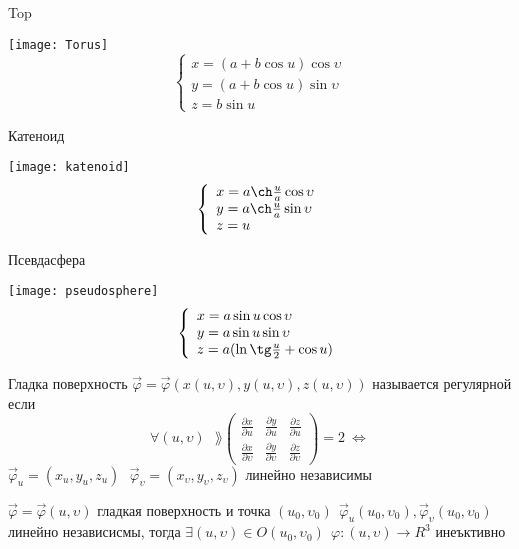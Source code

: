\begin{block}[Примеры]
  \begin{center}
    Top
  \end{center}
  \texttt{[image: Torus]}
  $$
  \left\{
  \begin{array}{l}
    x = (a + b\cos u) \cos \upsilon \\
    y = (a + b\cos u) \sin \upsilon \\
    z = b \sin u
  \end{array}
  \right.
  $$
  \begin{center}
    Катеноид
  \end{center}
  \texttt{[image: katenoid]}
  $$
  \left\{
  \begin{array}{l}
    x = a \ch \frac{u}{a} \cos \upsilon \\
    y = a \ch \frac{u}{a} \sin \upsilon \\
    z = u
  \end{array}
  \right.
  $$
  \begin{center}
    Псевдасфера
  \end{center}
  \texttt{[image: pseudosphere]}
  $$
  \left\{
  \begin{array}{l}
    x = a \sin u \cos \upsilon \\
    y = a \sin u \sin \upsilon \\
    z = a( \ln \tg \frac{u}{2} + \cos u)
  \end{array}
  \right.
  $$
\end{block}

\begin{define}
  Гладка поверхность $\vec \varphi = \vec \varphi
  (x(u, \upsilon), y(u, \upsilon), z(u, \upsilon))$ называется регулярной если
  $$
  \forall (u, \upsilon) ~~~
  \rang \left(
  \begin{array}{ccc}
    \frac{\partial x}{\partial u} & \frac{\partial y}{\partial u} &
    \frac{\partial z}{\partial u} \\
    \frac{\partial x}{\partial \upsilon} &
    \frac{\partial y}{\partial \upsilon} &
    \frac{\partial z}{\partial \upsilon}
  \end{array}
  \right) = 2 ~ \Leftrightarrow
  $$
  $\vec \varphi_u = (x_u, y_u, z_u) ~~~ \vec \varphi_{\upsilon} =
  (x_{\upsilon}, y_{\upsilon}, z_{\upsilon})$ линейно независимы
\end{define}

\begin{theorem}
  $\vec \varphi = \vec \varphi(u, \upsilon)$ гладкая поверхность и точка
  $(u_0, \upsilon_0) ~~ \vec \varphi_u (u_0, \upsilon_0),
  \vec \varphi_{\upsilon} (u_0, \upsilon_0)$ линейно независисмы, тогда
  $\exists (u, \upsilon) \in O(u_0, \upsilon_0) ~~ \varphi : (u, \upsilon)
  \to R^3$ инеъктивно
\end{theorem}

